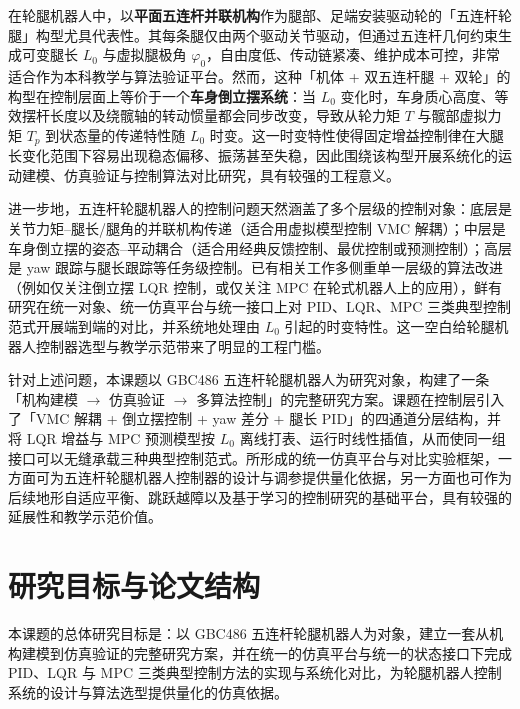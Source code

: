 \documentclass{smbuthesis}
\begin{document}
在轮腿机器人中，以\textbf{平面五连杆并联机构}作为腿部、足端安装驱动轮的「五连杆轮腿」构型尤具代表性。其每条腿仅由两个驱动关节驱动，但通过五连杆几何约束生成可变腿长 $L_0$ 与虚拟腿极角 $\varphi_0$，自由度低、传动链紧凑、维护成本可控，非常适合作为本科教学与算法验证平台\cite{Yoneda1994SkyHook,Tsai1999RobotAnalysis}。然而，这种「机体 + 双五连杆腿 + 双轮」的构型在控制层面上等价于一个\textbf{车身倒立摆系统}：当 $L_0$ 变化时，车身质心高度、等效摆杆长度以及绕髋轴的转动惯量都会同步改变，导致从轮力矩 $T$ 与髋部虚拟力矩 $T_p$ 到状态量的传递特性随 $L_0$ 时变\cite{Pathak2005WheeledIP}。这一时变特性使得固定增益控制律在大腿长变化范围下容易出现稳态偏移、振荡甚至失稳，因此围绕该构型开展系统化的运动建模、仿真验证与控制算法对比研究，具有较强的工程意义。

进一步地，五连杆轮腿机器人的控制问题天然涵盖了多个层级的控制对象：底层是关节力矩--腿长/腿角的并联机构传递（适合用虚拟模型控制 VMC 解耦）；中层是车身倒立摆的姿态--平动耦合（适合用经典反馈控制、最优控制或预测控制）；高层是 yaw 跟踪与腿长跟踪等任务级控制。已有相关工作多侧重单一层级的算法改进（例如仅关注倒立摆 LQR 控制\cite{AndersonMoore1990OptControl,KwakernaakSivan1972LinearOpt}，或仅关注 MPC 在轮式机器人上的应用\cite{Mayne2000ConstrainedMPC}），鲜有研究在统一对象、统一仿真平台与统一接口上对 PID、LQR、MPC 三类典型控制范式开展端到端的对比，并系统地处理由 $L_0$ 引起的时变特性。这一空白给轮腿机器人控制器选型与教学示范带来了明显的工程门槛。

针对上述问题，本课题以 GBC486 五连杆轮腿机器人为研究对象，构建了一条「机构建模 $\to$ 仿真验证 $\to$ 多算法控制」的完整研究方案。课题在控制层引入了「VMC 解耦 + 倒立摆控制 + yaw 差分 + 腿长 PID」的四通道分层结构，并将 LQR 增益与 MPC 预测模型按 $L_0$ 离线打表、运行时线性插值，从而使同一组接口可以无缝承载三种典型控制范式。所形成的统一仿真平台与对比实验框架，一方面可为五连杆轮腿机器人控制器的设计与调参提供量化依据，另一方面也可作为后续地形自适应平衡、跳跃越障以及基于学习的控制研究的基础平台，具有较强的延展性和教学示范价值。

\section{研究目标与论文结构}

本课题的总体研究目标是：以 GBC486 五连杆轮腿机器人为对象，建立一套从机构建模到仿真验证的完整研究方案，并在统一的仿真平台与统一的状态接口下完成 PID、LQR 与 MPC 三类典型控制方法的实现与系统化对比，为轮腿机器人控制系统的设计与算法选型提供量化的仿真依据。
\end{document}

